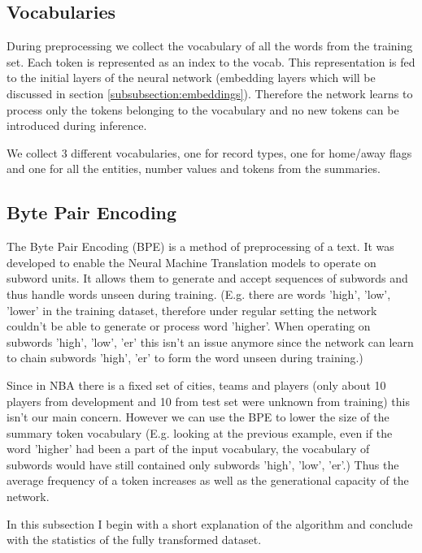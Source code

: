 \subsection{Vocabularies}

During preprocessing we collect the vocabulary of all the words from the training set. Each token is represented as an index to the vocab. This representation is fed to the initial layers of the neural network (embedding layers which will be discussed in section \ref{subsubsection:embeddings}). Therefore the network learns to process only the tokens belonging to the vocabulary and no new tokens can be introduced during inference.

We collect 3 different vocabularies, one for record types, one for home/away flags and one for all the entities, number values and tokens from the summaries.

\subsection{Byte Pair Encoding} \label{bpeSection}

The Byte Pair Encoding (BPE) \citep{sennrich2016} is a method of preprocessing of a text. It was developed to enable the Neural Machine Translation models to operate on subword units. It allows them to generate and accept sequences of subwords and thus handle words unseen during training. (E.g. there are words 'high', 'low', 'lower' in the training dataset, therefore under regular setting the network couldn't be able to generate or process word 'higher'. When operating on subwords 'high', 'low', 'er' this isn't an issue anymore since the network can learn to chain subwords 'high', 'er' to form the word unseen during training.)

Since in NBA there is a fixed set of cities, teams and players (only about 10 players from development and 10 from test set were unknown from training) this isn't our main concern. However we can use the BPE to lower the size of the summary token vocabulary (E.g. looking at the previous example, even if the word 'higher' had been a part of the input vocabulary, the vocabulary of subwords would have still contained only subwords 'high', 'low', 'er'.) Thus the average frequency of a token increases as well as the generational capacity of the network.

In this subsection I begin with a short explanation of the algorithm and conclude with the statistics of the fully transformed dataset.

